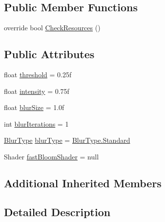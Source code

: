 \subsection*{Public Member Functions}
\begin{DoxyCompactItemize}
\item 
override bool \mbox{\hyperlink{class_unity_standard_assets_1_1_image_effects_1_1_bloom_optimized_acfddd1e3d1f02d7aa8abe96ba18da27f}{Check\+Resources}} ()
\end{DoxyCompactItemize}
\subsection*{Public Attributes}
\begin{DoxyCompactItemize}
\item 
float \mbox{\hyperlink{class_unity_standard_assets_1_1_image_effects_1_1_bloom_optimized_a0ef0dd7b3e5ffb8f00cf4205470801ee}{threshold}} = 0.\+25f
\item 
float \mbox{\hyperlink{class_unity_standard_assets_1_1_image_effects_1_1_bloom_optimized_a8ec9def7b3e5665976eafa9d258fd394}{intensity}} = 0.\+75f
\item 
float \mbox{\hyperlink{class_unity_standard_assets_1_1_image_effects_1_1_bloom_optimized_ad48371677d49eada1100c19f3f8a977c}{blur\+Size}} = 1.\+0f
\item 
int \mbox{\hyperlink{class_unity_standard_assets_1_1_image_effects_1_1_bloom_optimized_a8ff2522b67093656401cd6d2639ebb78}{blur\+Iterations}} = 1
\item 
\mbox{\hyperlink{class_unity_standard_assets_1_1_image_effects_1_1_bloom_optimized_a79317d54ae2cad9590852d264ebeabbf}{Blur\+Type}} \mbox{\hyperlink{class_unity_standard_assets_1_1_image_effects_1_1_bloom_optimized_acb813777e2dbedf40aecc524f7551af6}{blur\+Type}} = \mbox{\hyperlink{class_unity_standard_assets_1_1_image_effects_1_1_bloom_optimized_a79317d54ae2cad9590852d264ebeabbfaeb6d8ae6f20283755b339c0dc273988b}{Blur\+Type.\+Standard}}
\item 
Shader \mbox{\hyperlink{class_unity_standard_assets_1_1_image_effects_1_1_bloom_optimized_a68b688b90f439f8b2364d1aa275a69e0}{fast\+Bloom\+Shader}} = null
\end{DoxyCompactItemize}
\subsection*{Additional Inherited Members}


\subsection{Detailed Description}


